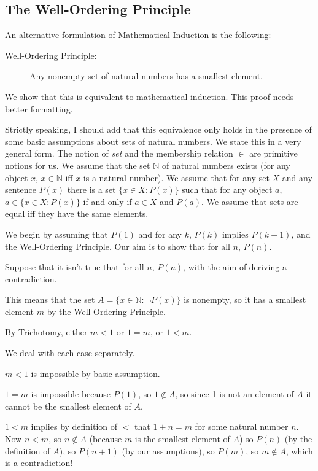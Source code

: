 \documentclass[12pt]{article}
\begin{document}
\subsection{The Well-Ordering Principle}

An alternative formulation of Mathematical Induction is the following:

\begin{description}

\item[Well-Ordering Principle:]  Any nonempty set of natural numbers has a smallest element.

\end{description}

We show that this is equivalent to mathematical induction.  This proof needs better formatting.

Strictly speaking, I should add that this equivalence only holds in the presence of some basic assumptions about sets of natural numbers.  We state this in a very general form.  The notion of {\em set\/} and the membership relation $\in$ are primitive notions for us.  We assume that the set $\mathbb N$ of natural numbers exists (for any object $x$, $x \in {\mathbb N}$ iff $x$ is a natural number).  We assume that for any set $X$ and any sentence $P(x)$ there is a set $\{x \in X : P(x)\}$ such that for any object $a$, $a \in \{x \in X : P(x)\}$ if and only if $a \in X$ and $P(a)$.  We assume that sets are equal iff they have the same elements.

We begin by assuming that $P(1)$ and for any $k$, $P(k)$ implies $P(k+1)$, and the Well-Ordering Principle.
Our aim is to show that for all $n$, $P(n)$.

Suppose that it isn't true that for all $n$, $P(n)$, with the aim of deriving a contradiction.

This means that the set $A=\{x \in {\mathbb N} :  \neg P(x)\}$ is nonempty, so it has a smallest element $m$ by the Well-Ordering Principle.

By Trichotomy, either $m<1$ or $1=m$, or $1<m$.

We deal with each case separately.

$m<1$ is impossible by basic assumption.

$1=m$ is impossible because $P(1)$, so $1 \not\in A$, so since 1 is not an element of $A$ it cannot be the smallest element of $A$.

$1<m$ implies by definition of $<$ that $1+n=m$ for some natural number $n$.  Now $n<m$, so $n \not\in A$ (because $m$ is the smallest element of $A$) so $P(n)$ (by the definition of $A$), so $P(n+1)$ (by our assumptions), so $P(m)$, so
$m \not\in A$, which is a contradiction!
\end{document}
